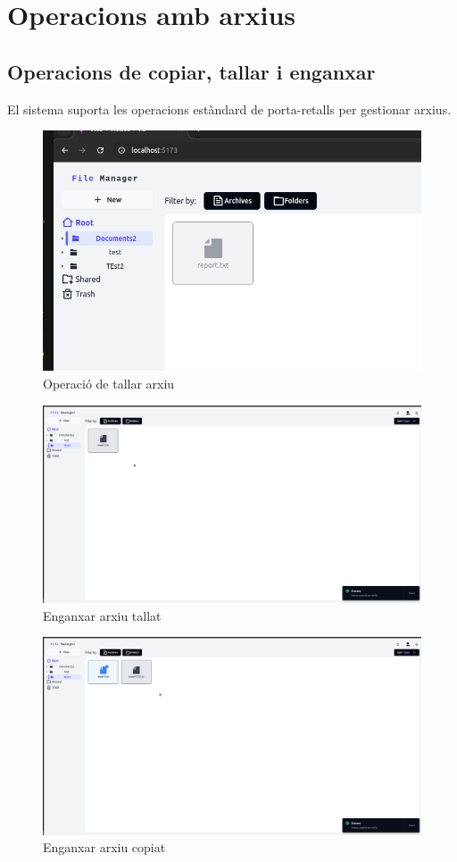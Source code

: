 \section{Operacions amb arxius}

\subsection{Operacions de copiar, tallar i enganxar}

El sistema suporta les operacions estàndard de porta-retalls per gestionar arxius.

\begin{figure}[H]
\centering
\includegraphics[width=0.7\linewidth]{Figures/implementacio/cutfile.png}
\caption{Operació de tallar arxiu}
\label{fig:cutfile}
\end{figure}

\begin{figure}[H]
\centering
\includegraphics[width=0.7\linewidth]{Figures/implementacio/pasteCutFileSuccess.png}
\caption{Enganxar arxiu tallat}
\label{fig:pasteCutFileSuccess}
\end{figure}

\begin{figure}[H]
\centering
\includegraphics[width=0.7\linewidth]{Figures/implementacio/pasteCopyFileSuccess.png}
\caption{Enganxar arxiu copiat}
\label{fig:pasteCopyFileSuccess}
\end{figure}

